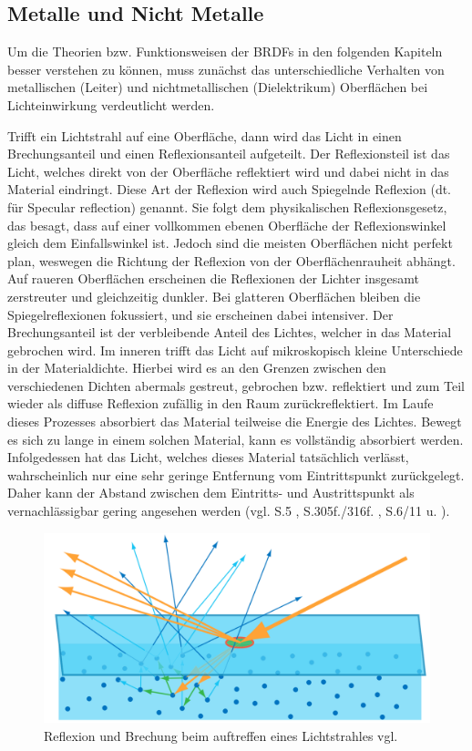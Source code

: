 \documentclass[
  11pt,
  a4paper,
  oneside
  ]{article}
\begin{document}
\subsection{Metalle und Nicht Metalle}
Um die Theorien bzw. Funktionsweisen der BRDFs in den folgenden Kapiteln besser verstehen zu können, muss zunächst das unterschiedliche Verhalten von metallischen (Leiter) und nichtmetallischen (Dielektrikum) Oberflächen bei Lichteinwirkung verdeutlicht werden.

Trifft ein Lichtstrahl auf eine Oberfläche, dann wird das Licht in einen Brechungsanteil und einen Reflexionsanteil aufgeteilt. Der Reflexionsteil ist das Licht, welches direkt von der Oberfläche reflektiert wird und dabei nicht in das Material eindringt. Diese Art der Reflexion wird auch Spiegelnde Reflexion (dt. für Specular reflection) genannt. Sie folgt dem physikalischen Reflexionsgesetz, das besagt, dass auf einer vollkommen ebenen Oberfläche der Reflexionswinkel gleich dem Einfallswinkel ist. Jedoch sind die meisten Oberflächen nicht perfekt plan, weswegen die Richtung der Reflexion von der Oberflächenrauheit abhängt. Auf raueren Oberflächen erscheinen die Reflexionen der Lichter insgesamt zerstreuter und gleichzeitig dunkler. Bei glatteren Oberflächen bleiben die Spiegelreflexionen fokussiert, und sie erscheinen dabei intensiver. Der Brechungsanteil ist der verbleibende Anteil des Lichtes, welcher in das Material gebrochen wird. Im inneren trifft das Licht auf mikroskopisch kleine Unterschiede in der Materialdichte. Hierbei wird es an den Grenzen zwischen den verschiedenen Dichten abermals gestreut, gebrochen bzw. reflektiert und zum Teil wieder als diffuse Reflexion zufällig in den Raum zurückreflektiert. Im Laufe dieses Prozesses absorbiert das Material teilweise die Energie des Lichtes. Bewegt es sich zu lange in einem solchen Material, kann es vollständig absorbiert werden. Infolgedessen hat das Licht, welches dieses Material tatsächlich verlässt, wahrscheinlich nur eine sehr geringe Entfernung vom Eintrittspunkt zurückgelegt. Daher kann der Abstand zwischen dem Eintritts- und Austrittspunkt als vernachlässigbar gering angesehen werden 
(vgl. S.5 \cite{irrlichtOrg}, S.305f./316f. \cite{realTimeRendering4th}, S.6/11 \cite{rtrPaper} u. \cite{learnOpenGL,pbrGuide,googleFilamentPbr}).
\begin{figure}[H]
  \centering
  \includegraphics*[width=0.65 \textwidth]{images/scattering.png}
  \caption{Reflexion und Brechung beim auftreffen eines Lichtstrahles vgl. \cite{learnOpenGL}}
  \label{fig:img10}
\end{figure}
\end{document}
